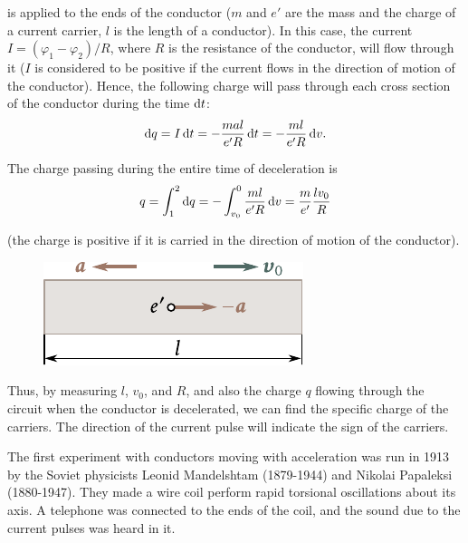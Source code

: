 \noindent
is applied to the ends of the conductor ($m$ and $e'$ are the mass and the charge of a current carrier, $l$ is the length of a conductor).
In this case, the current $I = (\varphi_1 - \varphi_2)/R$, where $R$ is the resistance of the conductor, will flow through it ($I$ is considered to be positive if the current flows in the direction of motion of the conductor).
Hence, the following charge will pass through each cross section of the conductor during the time $\mathrm{d} t$:
\begin{equation*}
    \mathrm{d} q = I\, \mathrm{d} t = - \frac{mal}{e'R}\, \mathrm{d} t = - \frac{ml}{e'R}\, \mathrm{d} v.
\end{equation*}

\noindent
The charge passing during the entire time of deceleration is
\begin{equation}\label{eq:11_1}
    q = \int_1^2 \mathrm{d} q = - \int_{v_0}^0 \frac{ml}{e'R}\, \mathrm{d} v = \frac{m}{e'} \frac{lv_0}{R}
\end{equation}

\noindent
(the charge is positive if it is carried in the direction of motion of the conductor).

\begin{figure}[t]
	\begin{center}
		\includegraphics[scale=1]{figures/ch_11/fig_11_1.pdf}
		\caption[]{}
		\label{fig:11_1}
	\end{center}
	\vspace{-0.8cm}
\end{figure}

Thus, by measuring $l$, $v_0$, and $R$, and also the charge $q$ flowing through the circuit when the conductor is decelerated, we can find the specific charge of the carriers.
The direction of the current pulse will indicate the sign of the carriers.

The first experiment with conductors moving with acceleration was run in 1913 by the Soviet physicists Leonid Mandelshtam (1879-1944) and Nikolai Papaleksi (1880-1947).
They made a wire coil perform rapid torsional oscillations about its axis. A telephone was connected to the ends of the coil, and the sound due to the current pulses was heard in it.

